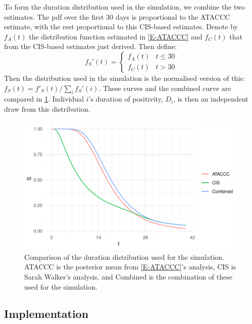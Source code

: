 \documentclass[thesis.tex]{subfiles}
\begin{document}
To form the duration distribution used in the simulation, we combine the two estimates.
The pdf over the first 30 days is proportional to the ATACCC estimate, with the rest proportional to this CIS-based estimates.
Denote by $f_A(t)$ the distribution function estimated in \cref{E-ATACCC} and $f_C(t)$ that from the CIS-based estimates just derived.
Then define:
$$
f_S'(t) = \begin{cases}
	f_A(t) &t \leq 30 \\
	f_C(t) &t > 30
\end{cases}
$$
Then the distribution used in the simulation is the normalised version of this: $f_S(t) = f'_S(t)/\sum_i f_S'(i)$.
These curves and the combined curve are compared in \cref{perf-test:fig:duration-dist}.
Individual $i$'s duration of positivity, $D_i$, is then an independent draw from this distribution.
\begin{figure}
  \centering \includegraphics{cis-perfect-testing/input-duration-dists}
  \caption[Comparison of duration distributions]{Comparison of the duration distribution used for the simulation. ATACCC is the posterior mean from \cref{E-ATACCC}'s analysis, CIS is Sarah Walker's analysis, and Combined is the combination of these used for the simulation. \label{perf-test:fig:duration-dist}}
\end{figure}

\subsection{Implementation}
\end{document}
